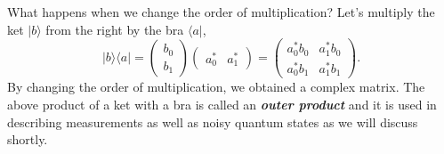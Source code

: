 What happens when we change the order of multiplication?
Let's multiply the ket $|b\rangle$ from the right by the bra $\langle a|$,
\begin{equation}
    | b\rangle \langle a | = \begin{pmatrix} b_0 \\ b_1 \end{pmatrix} \begin{pmatrix} a_0^* & a_1^* \end{pmatrix} = \begin{pmatrix} a_0^*b_0 & a_1^*b_0 \\ a_0^*b_1 & a_1^*b_1 \end{pmatrix}.
\end{equation}
By changing the order of multiplication, we obtained a complex matrix.
The above product of a ket with a bra is called an \textit{\textbf{outer product}}  and it is used in describing measurements as well as noisy quantum states as we will discuss shortly.

